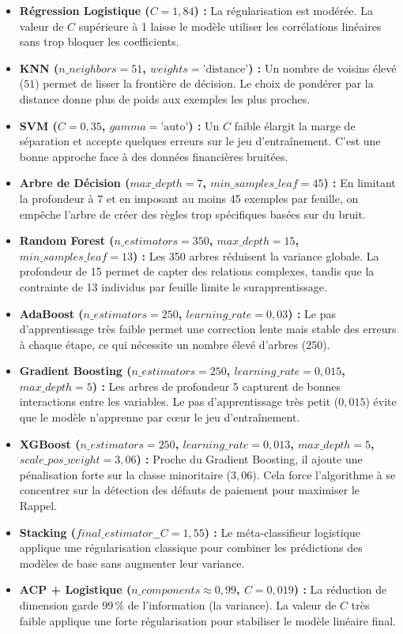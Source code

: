 \documentclass{article}
\begin{document}
\begin{itemize}
    \item \textbf{Régression Logistique ($C = 1,84$) :} La régularisation est modérée. La valeur de $C$ supérieure à 1 laisse le modèle utiliser les corrélations linéaires sans trop bloquer les coefficients.
    \item \textbf{KNN ($n\_neighbors = 51$, $weights = \text{'distance'}$) :} Un nombre de voisins élevé ($51$) permet de lisser la frontière de décision. Le choix de pondérer par la distance donne plus de poids aux exemples les plus proches.
    \item \textbf{SVM ($C = 0,35$, $gamma = \text{'auto'}$) :} Un $C$ faible élargit la marge de séparation et accepte quelques erreurs sur le jeu d'entraînement. C'est une bonne approche face à des données financières bruitées.
    \item \textbf{Arbre de Décision ($max\_depth = 7$, $min\_samples\_leaf = 45$) :} En limitant la profondeur à 7 et en imposant au moins 45 exemples par feuille, on empêche l'arbre de créer des règles trop spécifiques basées sur du bruit.
    \item \textbf{Random Forest ($n\_estimators = 350$, $max\_depth = 15$, $min\_samples\_leaf = 13$) :} Les 350 arbres réduisent la variance globale. La profondeur de 15 permet de capter des relations complexes, tandis que la contrainte de 13 individus par feuille limite le surapprentissage.
    \item \textbf{AdaBoost ($n\_estimators = 250$, $learning\_rate = 0,03$) :} Le pas d'apprentissage très faible permet une correction lente mais stable des erreurs à chaque étape, ce qui nécessite un nombre élevé d'arbres (250).
    \item \textbf{Gradient Boosting ($n\_estimators = 250$, $learning\_rate = 0,015$, $max\_depth = 5$) :} Les arbres de profondeur 5 capturent de bonnes interactions entre les variables. Le pas d'apprentissage très petit ($0,015$) évite que le modèle n'apprenne par cœur le jeu d'entraînement.
    \item \textbf{XGBoost ($n\_estimators = 250$, $learning\_rate = 0,013$, $max\_depth = 5$, $scale\_pos\_weight = 3,06$) :} Proche du Gradient Boosting, il ajoute une pénalisation forte sur la classe minoritaire ($3,06$). Cela force l'algorithme à se concentrer sur la détection des défauts de paiement pour maximiser le Rappel.
    \item \textbf{Stacking ($final\_estimator\_\_C = 1,55$) :} Le méta-classifieur logistique applique une régularisation classique pour combiner les prédictions des modèles de base sans augmenter leur variance.
    \item \textbf{ACP + Logistique ($n\_components \approx 0,99$, $C = 0,019$) :} La réduction de dimension garde $99\,\%$ de l'information (la variance). La valeur de $C$ très faible applique une forte régularisation pour stabiliser le modèle linéaire final.
\end{itemize}
\end{document}
